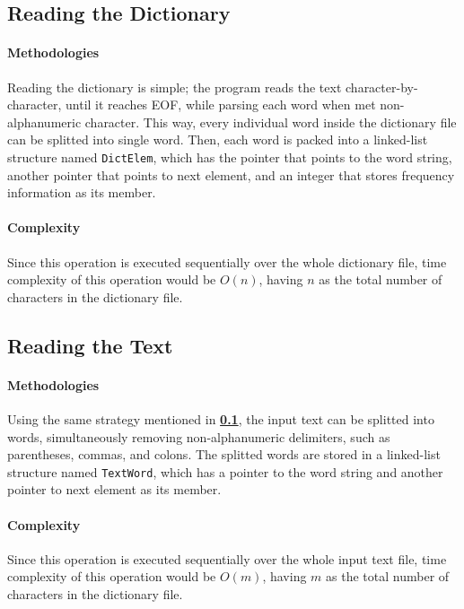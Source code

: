 \documentclass[11pt]{article}
\begin{document}
	\subsection{Reading the Dictionary} \label{dict-read}
	\paragraph{Methodologies}
	Reading the dictionary is simple; the program reads the text character-by-character, until it reaches EOF, while parsing each word when met non-alphanumeric character. This way, every individual word inside the dictionary file can be splitted into single word. Then, each word is packed into a linked-list structure named \texttt{DictElem}, which has the pointer that points to the word string, another pointer that points to next element, and an integer that stores frequency information as its member.
	
	\paragraph{Complexity}
	Since this operation is executed sequentially over the whole dictionary file, time complexity of this operation would be $ O(n) $, having $ n $ as the total number of characters in the dictionary file.
	
	\subsection{Reading the Text}
	\paragraph{Methodologies}
	Using the same strategy mentioned in \textbf{\ref{dict-read}}, the input text can be splitted into words, simultaneously removing non-alphanumeric delimiters, such as parentheses, commas, and colons. The splitted words are stored in a linked-list structure named \texttt{TextWord}, which has a pointer to the word string and another pointer to next element as its member.
	
	\paragraph{Complexity}
	Since this operation is executed sequentially over the whole input text file, time complexity of this operation would be $ O(m) $, having $ m $ as the total number of characters in the dictionary file.
	
\end{document}

